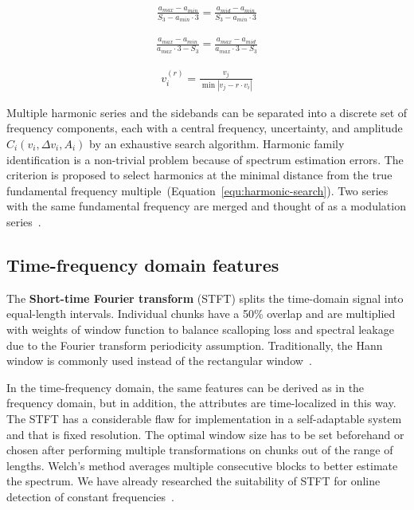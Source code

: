 \begin{ceqn}\begin{align}
\frac{a_{max} - a_{min}}{S_3 - a_{min} \cdot 3} = \frac{a_{mid} - a_{min}}{S_3 - a_{min} \cdot 3}
\label{equ:mms-maxima}
\end{align}\end{ceqn}

\begin{ceqn}\begin{align}
\frac{a_{max} - a_{min}}{a_{max} \cdot 3 - S_3} = \frac{a_{max} - a_{mid}}{a_{max} \cdot 3 - S_3}
\label{equ:mms-minima}
 \end{align}\end{ceqn}

\begin{ceqn}\begin{align}
v_i^{(r)} = \frac{v_j}{\min{|v_j - r \cdot v_i|}}
\label{equ:harmonic-search}
\end{align}\end{ceqn}

Multiple harmonic series and the sidebands can be separated into a discrete set of frequency components, each with a central frequency, uncertainty, and amplitude $C_i(v_i, \Delta v_i, A_i)$ by an exhaustive search algorithm. Harmonic family identification is a non-trivial problem because of spectrum estimation errors. The criterion is proposed to select harmonics at the minimal distance from the true fundamental frequency multiple~(Equation~\ref{equ:harmonic-search}). Two series with the same fundamental frequency are merged and thought of as a modulation series~\cite{gerber_identification_2013}.

\subsection{Time-frequency domain features}
The \textbf{Short-time Fourier transform} (STFT) splits the time-domain signal into equal-length intervals. Individual chunks have a 50\% overlap and are multiplied with weights of window function to balance scalloping loss and spectral leakage due to the Fourier transform periodicity assumption. Traditionally, the Hann window is commonly used instead of the rectangular window~\cite{ziaran_technicka_2013,noauthor_iso_2016_2}.

In the time-frequency domain, the same features can be derived as in the frequency domain, but in addition, the attributes are time-localized in this way. The STFT has a considerable flaw for implementation in a self-adaptable system and that is fixed resolution. The optimal window size has to be set beforehand or chosen after performing multiple transformations on chunks out of the range of lengths. Welch's method averages multiple consecutive blocks to better estimate the spectrum. We have already researched the suitability of STFT for online detection of constant frequencies~\cite{hajek_iot_2022}.

